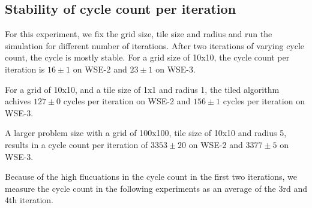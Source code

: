\documentclass{article}
\begin{document}
\subsection{Stability of cycle count per iteration}
For this experiment, we fix the grid size, tile size and radius and run the simulation for different number of iterations.
After two iterations of varying cycle count, the cycle is mostly stable.
For a grid size of 10x10, the cycle count per iteration is $16\pm1$ on WSE-2 and $23\pm1$ on WSE-3.

For a grid of 10x10, and a tile size of 1x1 and radius 1, the tiled algorithm achives $127\pm0$ cycles per iteration on WSE-2 and $156\pm1$ cycles per iteration on WSE-3.

A larger problem size with a grid of 100x100, tile size of 10x10 and radius 5, results in a cycle count per iteration of $3353\pm20$ on WSE-2 and $3377\pm5$ on WSE-3.

Because of the high flucuations in the cycle count in the first two iterations, we measure the cycle count in the following experiments as an average of the 3rd and 4th iteration.
\end{document}
